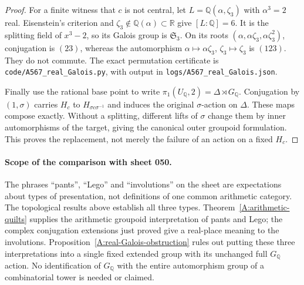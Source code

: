 \begin{proof}
For a finite witness that $c$ is not central, let
$L=\mathbb Q(\alpha,\zeta_3)$ with $\alpha^3=2$ real. Eisenstein's
criterion and $\zeta_3\notin\mathbb Q(\alpha)\subset\mathbb R$ give
$[L:\mathbb Q]=6$. It is the splitting field of $x^3-2$, so its
Galois group is $\mathfrak S_3$. On its roots
$(\alpha,\alpha\zeta_3,\alpha\zeta_3^2)$, conjugation is $(23)$,
whereas the automorphism $\alpha\mapsto\alpha\zeta_3$,
$\zeta_3\mapsto\zeta_3$ is $(123)$. They do not commute. The exact
permutation certificate is
\texttt{code/A567\_real\_Galois.py}, with output in
\texttt{logs/A567\_real\_Galois.json}.

Finally use the rational base point to write
$\pi_1(U_{\mathbb Q},2)=\Delta\rtimes G_{\mathbb Q}$. Conjugation by
$(1,\sigma)$ carries $H_c$ to $H_{\sigma c\sigma^{-1}}$ and induces
the original $\sigma$-action on $\Delta$. These maps compose exactly.
Without a splitting, different lifts of $\sigma$ change them by
inner automorphisms of the target, giving the canonical outer
groupoid formulation. This proves the replacement, not merely the
failure of an action on a fixed $H_c$.
\end{proof}

\paragraph{Scope of the comparison with sheet 050.}
The phrases ``pants'', ``Lego'' and ``involutions'' on the sheet are
expectations about types of presentation, not definitions of one
common arithmetic category. The topological results above establish
all three types. Theorem~\ref{A:arithmetic-quilts} supplies the
arithmetic groupoid interpretation of pants and Lego; the complex
conjugation extensions just proved give a real-place meaning to the
involutions. Proposition~\ref{A:real-Galois-obstruction} rules out
putting these three interpretations into a single fixed extended
group with its unchanged full $G_{\mathbb Q}$ action. No identification
of $G_{\mathbb Q}$ with the entire automorphism group of a combinatorial
tower is needed or claimed.

